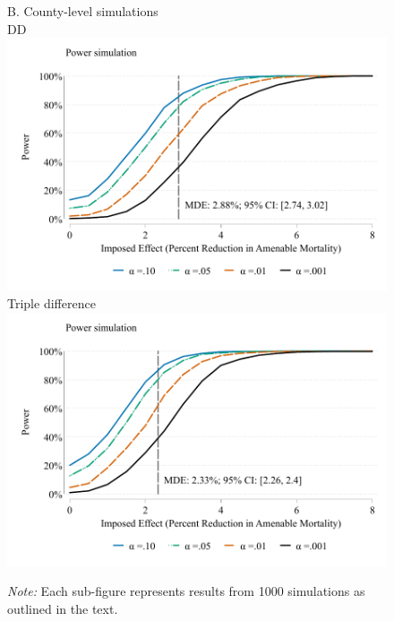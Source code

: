 \documentclass[12pt]{article}%
\begin{document}
\begin{figure}
\begin{minipage}{\linewidth}
\begin{minipage}{.5\linewidth}
       \end{minipage}
    \begin{minipage}{.5\linewidth}
    B. County-level simulations\\
    \centering
         DD\\
      \includegraphics[width=\linewidth]{../output/figures/power_dd_ln_amen_55_64_cluster_state_weight_attpop_controls_yes_preperiod_2001_2010.pdf} \\
      Triple difference\\
      \includegraphics[width=\linewidth]{../output/figures/power_ddd_ln_amen_none_cluster_state_weight_attpop_controls_yes_preperiod_2001_2010.pdf}
       \label{fig:power_simulation}
       \end{minipage}
       \begin{justify}
                {\footnotesize
                    \emph{Note:} 
                Each sub-figure represents results from 1000  simulations as outlined in the text.  
}
\end{justify}
\end{minipage}
\end{figure}
\end{document}
